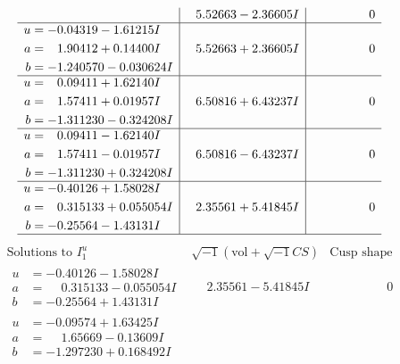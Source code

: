 \documentclass[1p]{elsarticle_modified}
\theoremstyle{definition}
\newcommand{\I}{\sqrt{-1}}
\begin{document}
$$\begin{array}{c|c|c}
 & \phantom{-}5.52663 - 2.36605 I & \phantom{-0.000000 } 0 \\ \hline\begin{aligned}
u &= -0.04319 - 1.61215 I \\
a &= \phantom{-}1.90412 + 0.14400 I \\
b &= -1.240570 - 0.030624 I\end{aligned}
 & \phantom{-}5.52663 + 2.36605 I & \phantom{-0.000000 } 0 \\ \hline\begin{aligned}
u &= \phantom{-}0.09411 + 1.62140 I \\
a &= \phantom{-}1.57411 + 0.01957 I \\
b &= -1.311230 - 0.324208 I\end{aligned}
 & \phantom{-}6.50816 + 6.43237 I & \phantom{-0.000000 } 0 \\ \hline\begin{aligned}
u &= \phantom{-}0.09411 - 1.62140 I \\
a &= \phantom{-}1.57411 - 0.01957 I \\
b &= -1.311230 + 0.324208 I\end{aligned}
 & \phantom{-}6.50816 - 6.43237 I & \phantom{-0.000000 } 0 \\ \hline\begin{aligned}
u &= -0.40126 + 1.58028 I \\
a &= \phantom{-}0.315133 + 0.055054 I \\
b &= -0.25564 - 1.43131 I\end{aligned}
 & \phantom{-}2.35561 + 5.41845 I & \phantom{-0.000000 } 0\\
 \hline 
 \end{array}$$\newpage$$\begin{array}{c|c|c}  
\text{Solutions to }I^u_{1}& \I (\text{vol} + \sqrt{-1}CS) & \text{Cusp shape}\\
 \hline 
\begin{aligned}
u &= -0.40126 - 1.58028 I \\
a &= \phantom{-}0.315133 - 0.055054 I \\
b &= -0.25564 + 1.43131 I\end{aligned}
 & \phantom{-}2.35561 - 5.41845 I & \phantom{-0.000000 } 0 \\ \hline\begin{aligned}
u &= -0.09574 + 1.63425 I \\
a &= \phantom{-}1.65669 - 0.13609 I \\
b &= -1.297230 + 0.168492 I\end{aligned}

\end{array}$$
\end{document}
